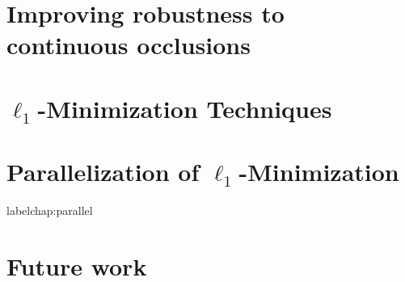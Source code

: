 \documentclass[draftthesis,tocnosub,noragright,centerchapter,12pt]{uiucecethesis09}
\begin{document}
\chapter{Improving robustness to continuous occlusions}
\label{chap:iccv}


\chapter{$\ell_1$-Minimization Techniques}
\label{chap:minimization}



\chapter{Parallelization of $\ell_1$-Minimization}
label{chap:parallel}
%

\chapter{Future work}
\label{chap:future}

\appendix 


\backmatter



\end{document}
